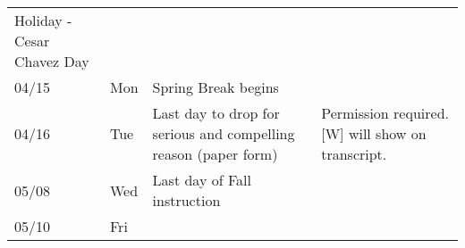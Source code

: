 \begin{longtable}[]{@{}llll@{}}
\begin{minipage}[t]{0.43\columnwidth}
Holiday - Cesar Chavez Day\strut
\end{minipage} & \begin{minipage}[t]{0.38\columnwidth}\raggedright
\strut
\end{minipage}\tabularnewline
\begin{minipage}[t]{0.05\columnwidth}\raggedright
04/15\strut
\end{minipage} & \begin{minipage}[t]{0.03\columnwidth}\raggedright
Mon\strut
\end{minipage} & \begin{minipage}[t]{0.43\columnwidth}\raggedright
Spring Break begins\strut
\end{minipage} & \begin{minipage}[t]{0.38\columnwidth}\raggedright
\strut
\end{minipage}\tabularnewline
\begin{minipage}[t]{0.05\columnwidth}\raggedright
04/16\strut
\end{minipage} & \begin{minipage}[t]{0.03\columnwidth}\raggedright
Tue\strut
\end{minipage} & \begin{minipage}[t]{0.43\columnwidth}\raggedright
Last day to drop for serious and compelling reason (paper form)\strut
\end{minipage} & \begin{minipage}[t]{0.38\columnwidth}\raggedright
Permission required. {[}W{]} will show on transcript.\strut
\end{minipage}\tabularnewline
\begin{minipage}[t]{0.05\columnwidth}\raggedright
05/08\strut
\end{minipage} & \begin{minipage}[t]{0.03\columnwidth}\raggedright
Wed\strut
\end{minipage} & \begin{minipage}[t]{0.43\columnwidth}\raggedright
Last day of Fall instruction\strut
\end{minipage} & \begin{minipage}[t]{0.38\columnwidth}\raggedright
\strut
\end{minipage}\tabularnewline
\begin{minipage}[t]{0.05\columnwidth}\raggedright
05/10\strut
\end{minipage} & \begin{minipage}[t]{0.03\columnwidth}\raggedright
Fri\strut
\end{minipage} & \begin{minipage}[t]{0.43\columnwidth}\raggedright

\end{minipage}
\end{longtable}
